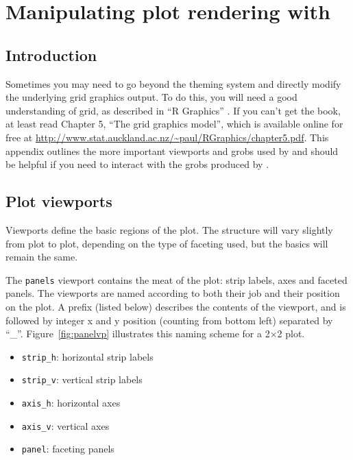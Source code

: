 

% 


\chapter{Manipulating plot rendering with }
\label{cha:grid}

\section{Introduction}

Sometimes you may need to go beyond the theming system and directly modify the underlying grid graphics output.  To do this, you will need a good understanding of grid, as described in ``R Graphics'' \citep{murrell:2005}.  If you can't get the book, at least read Chapter 5, ``The grid graphics model'', which is available online for free at  \url{http://www.stat.auckland.ac.nz/~paul/RGraphics/chapter5.pdf}.  This appendix outlines the more important viewports and grobs used by \ggplot and should be helpful if you need to interact with the grobs produced by \ggplot.

\section{Plot viewports}
\label{sec:plot-viewports}

Viewports define the basic regions of the plot.  The structure will vary slightly from plot to plot, depending on the type of faceting used, but the basics will remain the same. 

The {\tt panels} viewport contains the meat of the plot: strip labels, axes and faceted panels.  The viewports are named according to both their job and their position on the plot.  A prefix (listed below) describes the contents of the viewport, and is followed by integer x and y position (counting from bottom left) separated by ``\_''.  Figure~\ref{fig:panelvp} illustrates this naming scheme for a 2$\times$2 plot.

\begin{itemize}
  \item {\tt strip\_h}: horizontal strip labels
  \item {\tt strip\_v}: vertical strip labels
  \item {\tt axis\_h}: horizontal axes
  \item {\tt axis\_v}: vertical axes
  \item {\tt panel}: faceting panels
\end{itemize}

